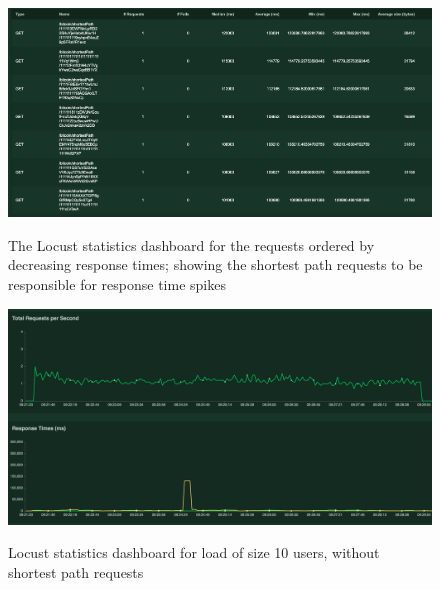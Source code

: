 \begin{appendices}
\begin{figure}[h!]
  \centering
  \includegraphics[width = 15cm]{./figures/100-users-shortestpath}\\[0.5cm]
  \caption{The Locust statistics dashboard for the requests ordered by decreasing response times; showing the shortest path requests to be responsible for response time spikes}
  \label{fig:100-users-path-finding-latencies}
\end{figure}

\begin{figure}
  \centering
  \includegraphics[width = 22cm]{./figures/10-users-no-path-locust}\\[0.5cm] 
  \caption{Locust statistics dashboard for load of size 10 users, without shortest path requests}
  \label{fig:10-users-stats-dashboard-no-path-finding}
\end{figure}


\end{appendices}
